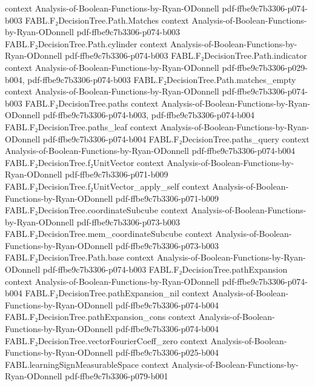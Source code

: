 \begin{theorem}
  {context}
  {Analysis-of-Boolean-Functions-by-Ryan-ODonnell}
  {pdf-ffbe9c7b3306-p074-b003}
\proofstep
  {FABL.F₂DecisionTree.Path.Matches}
  {context}
  {Analysis-of-Boolean-Functions-by-Ryan-ODonnell}
  {pdf-ffbe9c7b3306-p074-b003}
\proofstep
  {FABL.F₂DecisionTree.Path.cylinder}
  {context}
  {Analysis-of-Boolean-Functions-by-Ryan-ODonnell}
  {pdf-ffbe9c7b3306-p074-b003}
\proofstep
  {FABL.F₂DecisionTree.Path.indicator}
  {context}
  {Analysis-of-Boolean-Functions-by-Ryan-ODonnell}
  {pdf-ffbe9c7b3306-p029-b004,
    pdf-ffbe9c7b3306-p074-b003}
\proofstep
  {FABL.F₂DecisionTree.Path.matches_empty}
  {context}
  {Analysis-of-Boolean-Functions-by-Ryan-ODonnell}
  {pdf-ffbe9c7b3306-p074-b003}
\proofstep
  {FABL.F₂DecisionTree.paths}
  {context}
  {Analysis-of-Boolean-Functions-by-Ryan-ODonnell}
  {pdf-ffbe9c7b3306-p074-b003,
    pdf-ffbe9c7b3306-p074-b004}
\proofstep
  {FABL.F₂DecisionTree.paths_leaf}
  {context}
  {Analysis-of-Boolean-Functions-by-Ryan-ODonnell}
  {pdf-ffbe9c7b3306-p074-b004}
\proofstep
  {FABL.F₂DecisionTree.paths_query}
  {context}
  {Analysis-of-Boolean-Functions-by-Ryan-ODonnell}
  {pdf-ffbe9c7b3306-p074-b004}
\proofstep
  {FABL.F₂DecisionTree.f₂UnitVector}
  {context}
  {Analysis-of-Boolean-Functions-by-Ryan-ODonnell}
  {pdf-ffbe9c7b3306-p071-b009}
\proofstep
  {FABL.F₂DecisionTree.f₂UnitVector_apply_self}
  {context}
  {Analysis-of-Boolean-Functions-by-Ryan-ODonnell}
  {pdf-ffbe9c7b3306-p071-b009}
\proofstep
  {FABL.F₂DecisionTree.coordinateSubcube}
  {context}
  {Analysis-of-Boolean-Functions-by-Ryan-ODonnell}
  {pdf-ffbe9c7b3306-p073-b003}
\proofstep
  {FABL.F₂DecisionTree.mem_coordinateSubcube}
  {context}
  {Analysis-of-Boolean-Functions-by-Ryan-ODonnell}
  {pdf-ffbe9c7b3306-p073-b003}
\proofstep
  {FABL.F₂DecisionTree.Path.base}
  {context}
  {Analysis-of-Boolean-Functions-by-Ryan-ODonnell}
  {pdf-ffbe9c7b3306-p074-b003}
\proofstep
  {FABL.F₂DecisionTree.pathExpansion}
  {context}
  {Analysis-of-Boolean-Functions-by-Ryan-ODonnell}
  {pdf-ffbe9c7b3306-p074-b004}
\proofstep
  {FABL.F₂DecisionTree.pathExpansion_nil}
  {context}
  {Analysis-of-Boolean-Functions-by-Ryan-ODonnell}
  {pdf-ffbe9c7b3306-p074-b004}
\proofstep
  {FABL.F₂DecisionTree.pathExpansion_cons}
  {context}
  {Analysis-of-Boolean-Functions-by-Ryan-ODonnell}
  {pdf-ffbe9c7b3306-p074-b004}
\proofstep
  {FABL.F₂DecisionTree.vectorFourierCoeff_zero}
  {context}
  {Analysis-of-Boolean-Functions-by-Ryan-ODonnell}
  {pdf-ffbe9c7b3306-p025-b004}
\proofstep
  {FABL.learningSignMeasurableSpace}
  {context}
  {Analysis-of-Boolean-Functions-by-Ryan-ODonnell}
  {pdf-ffbe9c7b3306-p079-b001}

\end{theorem}
